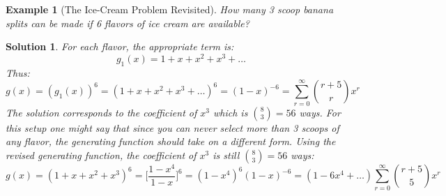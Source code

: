\documentclass[12pt, letterpaper, onecolumn, conference, final]{IEEEtran}
\theoremstyle{definition}
\newtheorem{lemma}{Lemma}[section]
\theoremstyle{plain}
\newtheorem{example}{Example}[section]
\newtheorem{solution}{Solution}[section]
\begin{document}
\begin{center}
\end{center}

\begin{example}[The Ice-Cream Problem Revisited]
How many 3 scoop banana splits can be made if 6 flavors of ice cream are available?
\end{example}
\begin{solution}
For each flavor, the appropriate term is:
\begin{equation*}
g_1(x) = 1 + x + x^2 + x^3 + \dots
\end{equation*}
Thus:
\begin{equation*}
g(x) = (g_1(x))^6 = (1 + x + x^2 + x^3 + \dots)^6 = (1-x)^{-6} = \sum_{r=0}^\infty {r+5 \choose r} x^r
\end{equation*}
The solution corresponds to the coefficient of $x^3$ which is ${8 \choose 3} = 56$ ways. For this setup one might say that since you can never select more than 3 scoops of any flavor, the generating function should take on a different form. Using the revised generating function, the coefficient of $x^3$ is still ${8 \choose 3} = 56$ ways:
\begin{equation*}
g(x) = (1 + x + x^2 + x^3)^6 = \Big[ \frac{1-x^4}{1-x} \Big]^6 = (1-x^4)^6 (1-x)^{-6} = (1 - 6x^4 + \dots) \sum_{r=0}^\infty {r+5 \choose 5} x^r
\end{equation*}
\end{solution}
\end{document}
